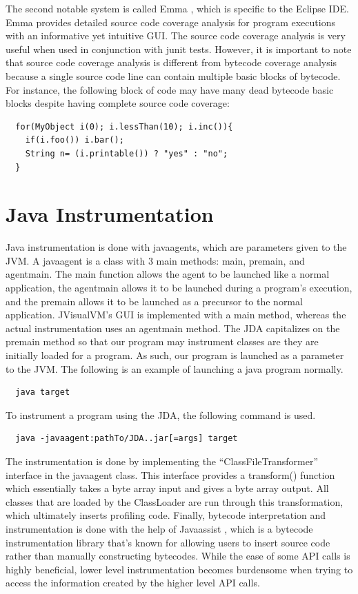 \documentclass[conference,10pt,twocolumn]{./IEEE/IEEEtran}
\begin{document}
The second notable system is called Emma \cite{Emma}, which is specific to the Eclipse IDE.
Emma provides detailed source code coverage analysis for program executions with an informative yet intuitive GUI.
The source code coverage analysis is very useful when used in conjunction with junit tests.
However, it is important to note that source code coverage analysis is different from bytecode coverage analysis because a single source code line can contain multiple basic blocks of bytecode.
For instance, the following block of code may have many dead bytecode basic blocks despite having complete source code coverage:


\begin{lstlisting}
  for(MyObject i(0); i.lessThan(10); i.inc()){
    if(i.foo()) i.bar();
    String n= (i.printable()) ? "yes" : "no";
  }
\end{lstlisting}

\section{Java Instrumentation}
Java instrumentation is done with javaagents, which are parameters given to the JVM.
A javaagent is a class with 3 main methods: main, premain, and agentmain.
The main function allows the agent to be launched like a normal application, the agentmain allows it to be launched during a program’s execution, and the premain allows it to be launched as a precursor to the normal application.
JVisualVM’s GUI is implemented with a main method, whereas the actual instrumentation uses an agentmain method.
The JDA capitalizes on the premain method so that our program may instrument classes are they are initially loaded for a program.
As such, our program is launched as a parameter to the JVM.  The following is an example of launching a java program normally.

\begin{lstlisting}
  java target
\end{lstlisting}

To instrument a program using the JDA, the following command is used.

\begin{lstlisting}
  java -javaagent:pathTo/JDA..jar[=args] target
\end{lstlisting}

The instrumentation is done by implementing the “ClassFileTransformer” interface in the javaagent class.
This interface provides a transform() function which essentially takes a byte array input and gives a byte array output.
All classes that are loaded by the ClassLoader are run through this transformation, which ultimately inserts profiling code.
Finally, bytecode interpretation and instrumentation is done with the help of Javaassist \cite{Javaassist}, which is a bytecode instrumentation library that’s known for allowing users to insert source code rather than manually constructing bytecodes.
While the ease of some API calls is highly beneficial, lower level instrumentation becomes burdensome when trying to access the information created by the higher level API calls.
\end{document}
